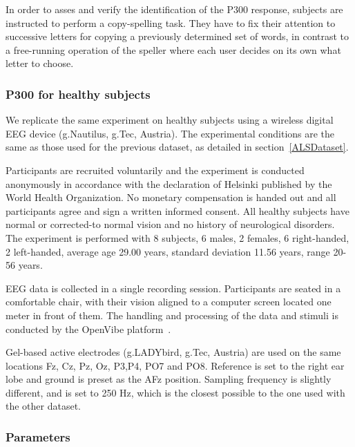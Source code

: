 \documentclass[utf8]{frontiersSCNS} %
\begin{document}
In order to asses and verify the identification of the P300 response, subjects are instructed to perform a copy-spelling task. They have to fix their attention to successive letters for copying a previously determined set of words, in contrast to a free-running operation of the speller where each user decides on its own what letter to choose.

\subsubsection{P300 for healthy subjects}

We replicate the same experiment on healthy subjects using a wireless digital EEG device (g.Nautilus, g.Tec, Austria).  The experimental conditions are the same as those used for the previous dataset, as detailed in section~\ref{ALSDataset}.

Participants are recruited voluntarily and the experiment is conducted anonymously in accordance with the declaration of Helsinki published by the World Health Organization.  No monetary compensation is handed out and all participants agree and sign a written informed consent.  All healthy subjects have normal or corrected-to normal vision and no history of neurological disorders. The experiment is performed with 8 subjects, 6 males, 2 females, 6 right-handed, 2 left-handed, average age 29.00 years, standard deviation  11.56 years, range 20-56 years.

EEG data is collected in a single recording session. Participants are seated in a comfortable chair, with their vision aligned to a computer screen located one meter in front of them.  The handling and processing of the data and stimuli is conducted by the OpenVibe platform~\citep{Renard2010}. 

Gel-based active electrodes (g.LADYbird, g.Tec, Austria) are used on the same locations Fz, Cz, Pz, Oz, P3,P4, PO7 and PO8.  Reference is set to the right ear lobe and ground is preset as the AFz position.   Sampling frequency is slightly different, and is set to 250 Hz, which is the closest possible to the one used with the other dataset.



\subsubsection{Parameters}
\end{document}

